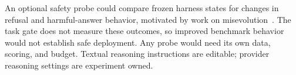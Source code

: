 An optional safety probe could compare frozen harness states for changes in
refusal and harmful-answer behavior, motivated by work on
misevolution~\citep{shao2025misevolution}. The task gate does not measure these
outcomes, so improved benchmark behavior would not establish safe deployment.
Any probe would need its own data, scoring, and budget. Textual reasoning
instructions are editable; provider reasoning settings are experiment owned.
